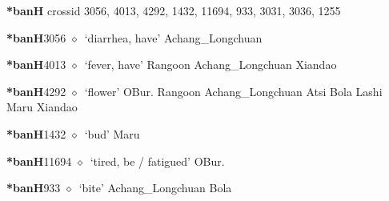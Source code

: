 \item
\textbf{*banH}
  {\tiny crossid 3056, 4013, 4292, 1432, 11694, 933, 3031, 3036, 1255}
  \begin{list}{}{\leftmargin=1.5em \itemindent=-1.5em}
  \item {\footnotesize \textbf{*banH}}{\tiny 3056}
         $\diamond$~`diarrhea, have'
         Achang\_Longchuan 
  \item {\footnotesize \textbf{*banH}}{\tiny 4013}
\hspace{1ex}
         $\diamond$~`fever, have'
         Rangoon 
\hspace{1ex}
         Achang\_Longchuan 
\hspace{1ex}
         Xiandao 
  \item {\footnotesize \textbf{*banH}}{\tiny 4292}
\hspace{1ex}
         $\diamond$~`flower'
         OBur. 
\hspace{1ex}
         Rangoon 
\hspace{1ex}
         Achang\_Longchuan 
\hspace{1ex}
         Atsi 
\hspace{1ex}
         Bola 
\hspace{1ex}
         Lashi 
\hspace{1ex}
         Maru 
\hspace{1ex}
         Xiandao 
  \item {\footnotesize \textbf{*banH}}{\tiny 1432}
\hspace{1ex}
         $\diamond$~`bud'
         Maru 
  \item {\footnotesize \textbf{*banH}}{\tiny 11694}
\hspace{1ex}
         $\diamond$~`tired, be / fatigued'
         OBur. 
  \item {\footnotesize \textbf{*banH}}{\tiny 933}
\hspace{1ex}
         $\diamond$~`bite'
         Achang\_Longchuan 
\hspace{1ex}
         Bola 

\end{list}
